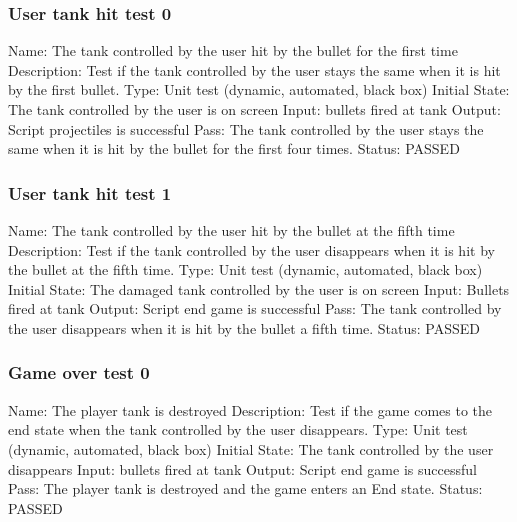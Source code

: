 \documentclass{article}
\begin{document}
\subsubsection{User tank hit test 0}
\label{sec:3.1.25}
Name: The tank controlled by the user hit by the bullet for the first time
\newline
Description: Test if the tank controlled by the user stays the same when it is 
hit by the first bullet. \newline
Type: Unit test (dynamic, automated, black box) \newline
Initial State:  The tank controlled by the user is on screen \newline
Input: bullets fired at tank\newline
Output: Script projectiles is successful  \newline
Pass: The tank controlled by the user stays the same when it is hit by the 
bullet for the first four times. \newline
\newline Status: PASSED

\subsubsection{User tank hit test 1}
\label{sec:3.1.26}
Name:  The tank controlled by the user hit by the bullet at the fifth time
\newline
Description: Test if the tank controlled by the user disappears when it is hit 
by the bullet at the fifth time. \newline
Type: Unit test (dynamic, automated, black box) \newline
Initial State:  The damaged tank controlled by the user is on screen
 \newline
Input: Bullets fired at tank\newline
Output: Script end game is successful\newline
Pass: The tank controlled by the user disappears when it is hit by the bullet 
a fifth time. \newline
\newline Status: PASSED

\subsubsection{Game over test 0}
\label{sec:3.1.27}
Name:  The player tank is destroyed\newline
Description: Test if the game comes to the end state when the tank controlled 
by the user disappears. \newline
Type: Unit test (dynamic, automated, black box) \newline
Initial State:  The tank controlled by the user disappears\newline
Input: bullets fired at tank\newline
Output: Script end game is successful\newline
Pass:  The player tank is destroyed and the game enters an End state. \newline
\newline Status: PASSED
\end{document}
